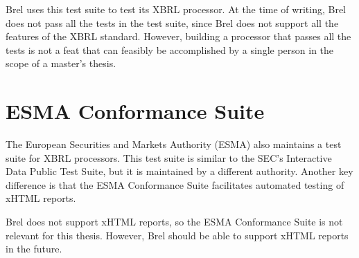 Brel uses this test suite to test its XBRL processor.
At the time of writing, Brel does not pass all the tests in the test suite, since Brel does not support all the features of the XBRL standard.
However, building a processor that passes all the tests is not a feat that can feasibly be accomplished by a single person in the scope of a master's thesis.

\section{ESMA Conformance Suite}
The European Securities and Markets Authority (ESMA) also maintains a test suite for XBRL processors\cite{esma_conformance_suite}.
This test suite is similar to the SEC's Interactive Data Public Test Suite, but it is maintained by a different authority.
Another key difference is that the ESMA Conformance Suite facilitates automated testing of xHTML reports.

Brel does not support xHTML reports, so the ESMA Conformance Suite is not relevant for this thesis.
However, Brel should be able to support xHTML reports in the future.
